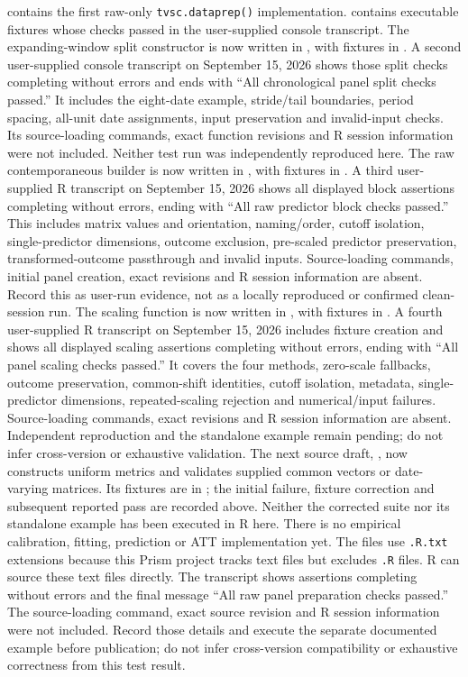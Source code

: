 \documentclass[11pt]{article}
\begin{document}
 contains the first raw-only
\texttt{tvsc.dataprep()} implementation. 
contains executable fixtures whose checks passed in the user-supplied
console transcript. The expanding-window split constructor is now written
in , with fixtures in
. A second user-supplied console transcript on
September 15, 2026 shows those split checks completing without errors and
ends with ``All chronological panel split checks passed.'' It includes the
eight-date example, stride/tail boundaries, period spacing, all-unit date
assignments, input preservation and invalid-input checks. Its source-loading
commands, exact function revisions and R session information were not
included. Neither test run was independently reproduced here.
The raw contemporaneous builder is now written in ,
with fixtures in . A third user-supplied R
transcript on September 15, 2026 shows all displayed block assertions
completing without errors, ending with ``All raw predictor block checks
passed.'' This includes matrix values and orientation, naming/order,
cutoff isolation, single-predictor dimensions, outcome exclusion, pre-scaled
predictor preservation, transformed-outcome passthrough and invalid inputs.
Source-loading commands, initial panel creation, exact revisions and R
session information are absent. Record this as user-run evidence, not as
a locally reproduced or confirmed clean-session run. The scaling function
is now written in , with fixtures in
. A fourth user-supplied R transcript on
September 15, 2026 includes fixture creation and shows all displayed
scaling assertions completing without errors, ending with ``All panel
scaling checks passed.'' It covers the four methods, zero-scale fallbacks,
outcome preservation, common-shift identities, cutoff isolation, metadata,
single-predictor dimensions, repeated-scaling rejection and numerical/input
failures. Source-loading commands, exact revisions and R session information
are absent. Independent reproduction and the standalone example remain
pending; do not infer cross-version or exhaustive validation. The next
source draft, , now constructs uniform metrics
and validates supplied common vectors or date-varying matrices. Its
fixtures are in ; the initial failure, fixture
correction and subsequent reported pass are recorded above. Neither the corrected suite nor
its standalone example has been executed in R here. There is no
empirical calibration, fitting, prediction or ATT implementation yet.
The files use \texttt{.R.txt} extensions because this Prism project
tracks text files but excludes \texttt{.R} files. R can source these text
files directly. The transcript shows assertions completing without errors
and the final message ``All raw panel preparation checks passed.'' The
source-loading command, exact source revision and R session information
were not included. Record those details and execute the separate documented
example before publication; do not infer cross-version compatibility or
exhaustive correctness from this test result.
\end{document}
